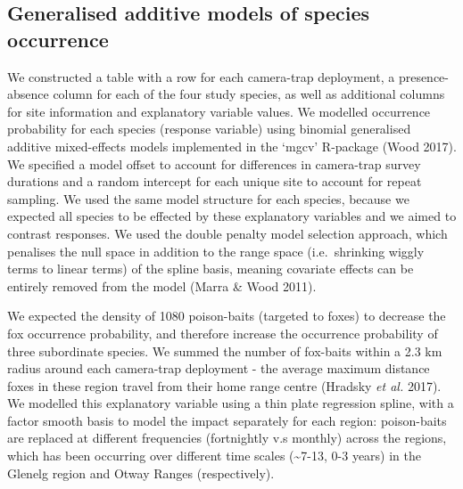 \documentclass[11pt,a4paper,titlepage,twoside,openright]{style/unimelbthesis}
\begin{document}
\begin{mainmatter}
\hypertarget{generalised-additive-models-of-species-occurrence}{%
\subsection{Generalised additive models of species occurrence}\label{generalised-additive-models-of-species-occurrence}}

We constructed a table with a row for each camera-trap deployment, a presence-absence column for each of the four study species, as well as additional columns for site information and explanatory variable values. We modelled occurrence probability for each species (response variable) using binomial generalised additive mixed-effects models implemented in the `mgcv' R-package (Wood 2017). We specified a model offset to account for differences in camera-trap survey durations and a random intercept for each unique site to account for repeat sampling. We used the same model structure for each species, because we expected all species to be effected by these explanatory variables and we aimed to contrast responses. We used the double penalty model selection approach, which penalises the null space in addition to the range space (i.e.~shrinking wiggly terms to linear terms) of the spline basis, meaning covariate effects can be entirely removed from the model (Marra \& Wood 2011).

We expected the density of 1080 poison-baits (targeted to foxes) to decrease the fox occurrence probability, and therefore increase the occurrence probability of three subordinate species. We summed the number of fox-baits within a 2.3 km radius around each camera-trap deployment - the average maximum distance foxes in these region travel from their home range centre (Hradsky \emph{et al.} 2017). We modelled this explanatory variable using a thin plate regression spline, with a factor smooth basis to model the impact separately for each region: poison-baits are replaced at different frequencies (fortnightly v.s monthly) across the regions, which has been occurring over different time scales (\textasciitilde7-13, 0-3 years) in the Glenelg region and Otway Ranges (respectively).


\end{mainmatter}
\end{document}
